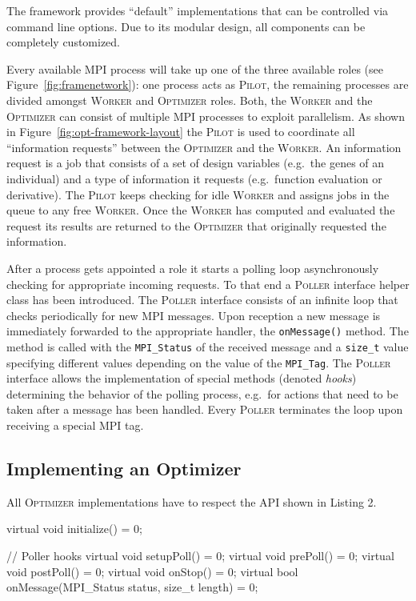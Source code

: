 \documentclass[%
reprint,
amsmath,amssymb,
aps,
]{revtex4-1}
\begin{document}
The framework provides ``default'' implementations that can be controlled via
  command line options.
Due to its modular design, all components can be completely customized.

Every available MPI process will take up one of the three available roles (see
  Figure~\ref{fig:framenetwork}):  one process acts as \textsc{Pilot}, the
  remaining processes are divided amongst \textsc{Worker} and
  \textsc{Optimizer} roles.
Both, the \textsc{Worker} and the \textsc{Optimizer} can consist of multiple
  MPI processes to exploit parallelism.
As shown in Figure~\ref{fig:opt-framework-layout} the \textsc{Pilot} is used
  to coordinate all ``information requests'' between the \textsc{Optimizer}
  and the \textsc{Worker}.
An information request is a job that consists of a set of design variables
  (e.g.~the genes of an individual) and a type of information it requests
  (e.g.~function evaluation or derivative).
The \textsc{Pilot} keeps checking for idle \textsc{Worker} and assigns jobs
  in the queue to any free \textsc{Worker}.
Once the \textsc{Worker} has computed and evaluated the request its results
  are returned to the \textsc{Optimizer} that originally requested the
  information.

After a process gets appointed a role it starts a polling loop asynchronously
  checking for appropriate incoming requests.
To that end a \textsc{Poller} interface helper class has been introduced.
The \textsc{Poller} interface consists of an infinite loop that checks
  periodically for new MPI messages.
Upon reception a new message is immediately forwarded to the appropriate
  handler, the \texttt{onMessage()} method.
The method is called with the \texttt{MPI\_Status} of the received message and
  a \texttt{size\_t} value specifying different values depending on the value
  of the \texttt{MPI\_Tag}.
The \textsc{Poller} interface allows the implementation of special methods
  (denoted \textit{hooks}) determining the behavior of the polling process,
  e.g.\ for actions that need to be taken after a message has been handled.
Every \textsc{Poller} terminates the loop upon receiving a special MPI tag.


\subsection{Implementing an Optimizer}

All \textsc{Optimizer} implementations have to respect the API shown in
Listing 2.

\begin{code}
virtual void initialize() = 0;

// Poller hooks
virtual void setupPoll() = 0;
virtual void prePoll() = 0;
virtual void postPoll() = 0;
virtual void onStop() = 0;
virtual bool onMessage(MPI_Status status,
                       size_t length) = 0;
\end{code}
\end{document}

